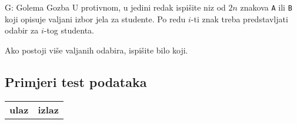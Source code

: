 \begin{statement}[
  timelimit=1 s,
  memorylimit=512 MiB,
]{G: Golema Gozba}
U protivnom, u jedini redak ispišite niz od $2n$ znakova \texttt{A} ili
\texttt{B} koji opisuje valjani izbor jela za studente. Po redu $i$-ti znak
treba predstavljati odabir za $i$-tog studenta.

Ako postoji više valjanih odabira, ispišite bilo koji.

\subsection*{Primjeri test podataka}
\begin{tabularx}{\textwidth}{XX}
    \textbf{ulaz}
  \linespread{1}{} &
  \textbf{izlaz}
  \linespread{1}{}
\end{tabularx}

\end{statement}

